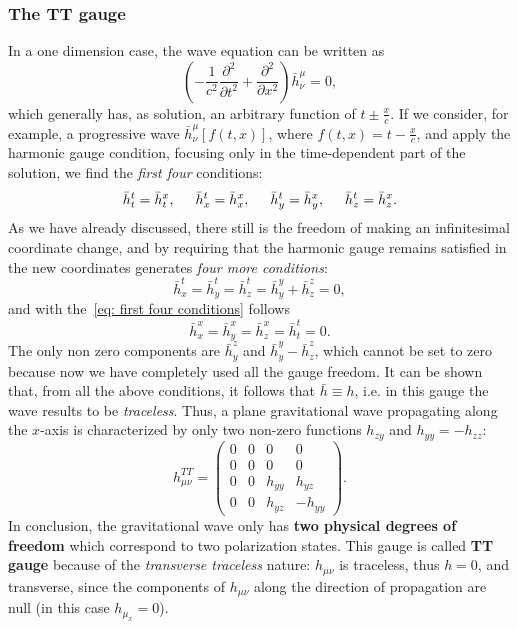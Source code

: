 \subsubsection{The TT gauge}
In a one dimension case, the wave equation can be written as
\[
    \left( -\frac{1}{c^2} \frac{\partial^2}{\partial t^2}  + \frac{\partial^2}{\partial x^2}\right)\bar{h}^\mu_\nu = 0,
\]
which generally has, as solution, an arbitrary function of $t\pm \frac{x}{c}$.
If we consider, for example, a progressive wave $\bar{h}^\mu_\nu [f(t,x)]$, where $f(t,x) = t- \frac{x}{c}$, and apply the harmonic gauge condition, focusing only in the time-dependent part of the solution, we find the \textit{first four} conditions:
\begin{equation}
    \bar{h}^t_t = \bar{h}^x_t, \hspace{5mm} \bar{h}^t_x = \bar{h}^x_x, \hspace{5mm} \bar{h}^t_y = \bar{h}^x_y, \hspace{5mm} \bar{h}^t_z = \bar{h}^x_z.
    \label{eq: first four conditions}
\end{equation}
As we have already discussed, there still is the freedom of making an infinitesimal coordinate change, and by requiring that the harmonic gauge remains satisfied in the new coordinates generates \textit{four more conditions}:
\begin{equation}
    \bar{h}^t_x = \bar{h}^t_y = \bar{h}^t_z = \bar{h}^y_y + \bar{h}^z_z = 0,
    \label{eq: second four conditions}
\end{equation}
and with the~\eqref{eq: first four conditions} follows
\[
     \bar{h}^x_x = \bar{h}^x_y = \bar{h}^x_z = \bar{h}^t_t = 0.
\]
The only non zero components are $\bar{h}^z_y$ and $\bar{h}^y_y - \bar{h}^z_z$, which cannot be set to zero because now we have completely used all the gauge freedom.
It can be shown that, from all the above conditions, it follows that $\bar{h} \equiv h$, i.e. in this gauge the wave results to be \textit{traceless}.
Thus, a plane gravitational wave propagating along the $x$-axis is characterized by only two non-zero functions $h_{zy}$ and $h_{yy}=-h_{zz}$:
\begin{equation}
    h^{TT}_{\mu\nu} =  
    \begin{pmatrix}
0 & 0 & 0 & 0 \\
0 & 0 & 0 & 0 \\
0 & 0 & h_{yy} & h_{yz} \\
0 & 0 & h_{yz} & -h_{yy}
\end{pmatrix}.
    \label{eq: h as a matrix in x case}
\end{equation}
In conclusion, the gravitational wave only has \textbf{two physical degrees of freedom} which correspond to two polarization states.
This gauge is called \textbf{TT gauge} because of the \textit{transverse traceless} nature: $h_{\mu\nu}$ is traceless, thus $h=0$, and transverse, since the components of $h_{\mu\nu}$ along the direction of propagation are null (in this case $h_{\mu_x}=0$).

